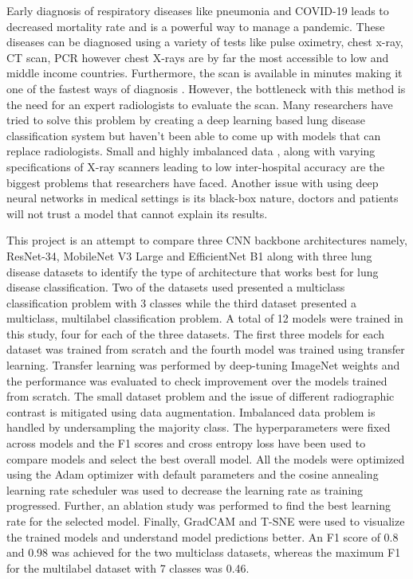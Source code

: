 \documentclass[10pt,twocolumn,letterpaper]{article}
\begin{document}
Early diagnosis of respiratory diseases like pneumonia and COVID-19 leads to decreased mortality 
rate \cite{daniel2016time} and is a powerful way to manage a pandemic\cite{xu2020facile}. 
These diseases can be diagnosed using a variety of tests like pulse oximetry, chest x-ray, 
CT scan\cite{mattsmith2022},  PCR\cite{akhtar1996pcr} however chest X-rays are by far the most 
accessible\cite{frija2021improve} to low and middle income countries. 
Furthermore, the scan is available in minutes making it one of the fastest ways of diagnosis
\cite{healthwise2021}. However, the bottleneck with this method 
is the need for an expert radiologists to evaluate the scan\cite{mehrotra2009radiologists}. 
Many researchers have tried to solve this problem by creating a deep learning based
lung disease classification system \cite{wang2021deep} but 
haven't been able to come up with models that can replace radiologists. Small 
\cite{guefrechi2021deep} and highly imbalanced data \cite{wang2021deep}, along with varying 
specifications of X-ray scanners leading to low inter-hospital accuracy \cite{melissarohman2018}
are the biggest problems that 
researchers have faced. Another issue with using deep neural networks in medical settings is 
its black-box nature\cite{paulblazek2022}, doctors and patients will not trust a model that 
cannot explain its results\cite{aleksandra2019}. 

This project is an attempt to compare three CNN backbone architectures namely, ResNet-34, 
MobileNet V3 Large and EfficientNet B1 along with three lung disease datasets 
to identify the type of architecture that works best for lung disease classification. Two 
of the datasets used presented a multiclass classification problem with 3 classes while 
the third dataset presented a multiclass, multilabel classification problem. A total 
of 12 models were trained in this study, four for each of the three datasets. The first 
three models for each dataset was trained from scratch and the fourth model was trained 
using transfer learning. Transfer learning was performed by deep-tuning ImageNet
weights and the performance was evaluated to check improvement over the models trained from scratch. 
The small dataset problem and the issue of different radiographic contrast \cite{andrew2022rad} 
is mitigated using data augmentation. Imbalanced data problem is handled by undersampling the 
majority class. The hyperparameters were fixed across models and the F1 scores and cross entropy loss 
have been used to compare models and select the best overall model. All the models were optimized using 
the Adam optimizer \cite{kingma2014adam} with default parameters and the cosine annealing \cite{loshchilov2016sgdr} 
learning rate scheduler was used to decrease the learning rate as training progressed.
Further, an ablation study was performed to find the best learning rate for the selected model.
Finally, GradCAM \cite{jacobgilpytorchcam} and T-SNE were used to visualize the trained models and understand 
model predictions better. An F1 score of 0.8 and 0.98 was achieved for the two multiclass
datasets, whereas the maximum F1 for the multilabel dataset with 7 classes was 0.46.
\end{document}
